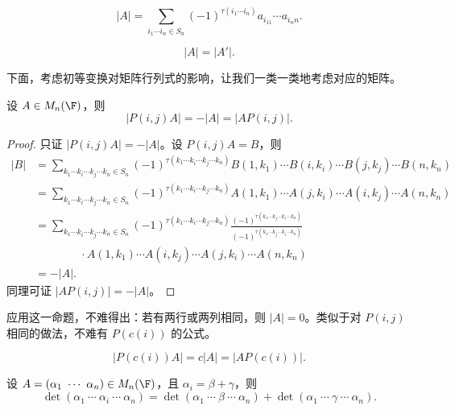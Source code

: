 \begin{corollary}\label{3.7.3}
	\[
	|A|=
	\sum_{i_1\cdots i_n\in S_n}
	(-1)^{\tau(i_1\cdots i_n)}
	a_{i_11}\cdots a_{i_nn}.
	\]
\end{corollary}

\begin{corollary}\label{3.7.4}
	\[
	|A|=|A'|.
	\]
\end{corollary}

下面，考虑初等变换对矩阵行列式的影响，让我们一类一类地考虑对应的矩阵。

\begin{proposition}\label{3.7.5}
	设 $A\in M_n(\F)$，则
	\[
	|P(i,j)A|=-|A|=|AP(i,j)|.
	\]
\end{proposition}

\begin{proof}
	只证 $|P(i,j)A|=-|A|$。设 $P(i,j)A=B$，则
	\[
	\begin{aligned}
		|B|
		&=\sum_{k_1\cdots k_i\cdots k_j\cdots k_n\in S_n}
		(-1)^{\tau(k_1\cdots k_i\cdots k_j\cdots k_n)}
		B(1,k_1)\cdots B(i,k_i)\cdots B(j,k_j)\cdots B(n,k_n)\\
		&=\sum_{k_1\cdots k_i\cdots k_j\cdots k_n\in S_n}
		(-1)^{\tau(k_1\cdots k_i\cdots k_j\cdots k_n)}
		A(1,k_1)\cdots A(j,k_i)\cdots A(i,k_j)\cdots A(n,k_n)\\
		&=\sum_{k_1\cdots k_i\cdots k_j\cdots k_n\in S_n}
		(-1)^{\tau(k_1\cdots k_i\cdots k_j\cdots k_n)}
		\frac{(-1)^{\tau(k_1\cdots k_j\cdots k_i\cdots k_n)}}
		{(-1)^{\tau(k_1\cdots k_j\cdots k_i\cdots k_n)}}\\
		&\qquad\qquad\cdot
		A(1,k_1)\cdots A(i,k_j)\cdots A(j,k_i)\cdots A(n,k_n)\\
		&=-|A|.
	\end{aligned}
	\]
	同理可证 $|AP(i,j)|=-|A|$。
\end{proof}

应用这一命题，不难得出：若有两行或两列相同，则 $|A|=0$。类似于对 $P(i,j)$ 相同的做法，不难有 $P(c(i))$ 的公式。

\begin{proposition}\label{3.7.6}
	\[
	|P(c(i))A|=c|A|=|AP(c(i))|.
	\]
\end{proposition}

\begin{proposition}\label{3.7.7}
	设 $A=(\alpha_1\ \cdots\ \alpha_n)\in M_n(\F)$，且 $\alpha_i=\beta+\gamma$，则
	\[
	\det(\alpha_1\ \cdots\ \alpha_i\ \cdots\ \alpha_n)
	=
	\det(\alpha_1\ \cdots\ \beta\ \cdots\ \alpha_n)
	+
	\det(\alpha_1\ \cdots\ \gamma\ \cdots\ \alpha_n).
	\]
\end{proposition}

